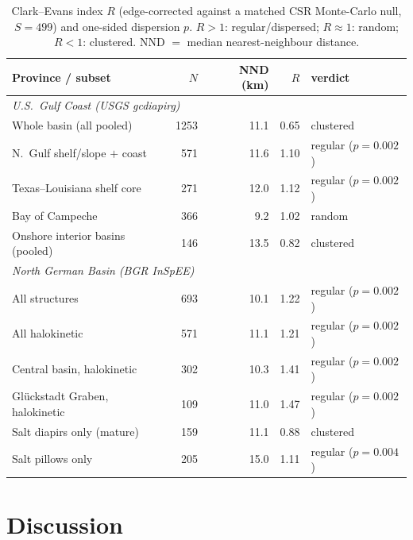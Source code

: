 \documentclass[11pt]{article}
\begin{document}
\begin{table}[t]
\centering
\caption{Clark--Evans index $R$ (edge-corrected against a matched CSR Monte-Carlo null, $S=499$) and
one-sided dispersion $p$. $R>1$: regular/dispersed; $R\approx1$: random; $R<1$: clustered. NND $=$ median
nearest-neighbour distance.}
\label{tab:R}
\small
\begin{tabular}{lrrrl}
\toprule
Province / subset & $N$ & NND (km) & $R$ & verdict \\
\midrule
\multicolumn{5}{l}{\emph{U.S.\ Gulf Coast (USGS gcdiapirg)}}\\
\quad Whole basin (all pooled)            & 1253 & 11.1 & 0.65 & clustered \\
\quad N.\ Gulf shelf/slope $+$ coast      & 571  & 11.6 & 1.10 & regular ($p=0.002$) \\
\quad Texas--Louisiana shelf core         & 271  & 12.0 & 1.12 & regular ($p=0.002$) \\
\quad Bay of Campeche                     & 366  & 9.2  & 1.02 & random \\
\quad Onshore interior basins (pooled)    & 146  & 13.5 & 0.82 & clustered \\
\midrule
\multicolumn{5}{l}{\emph{North German Basin (BGR InSpEE)}}\\
\quad All structures                      & 693  & 10.1 & 1.22 & regular ($p=0.002$) \\
\quad All halokinetic                     & 571  & 11.1 & 1.21 & regular ($p=0.002$) \\
\quad Central basin, halokinetic          & 302  & 10.3 & 1.41 & regular ($p=0.002$) \\
\quad Gl\"uckstadt Graben, halokinetic    & 109  & 11.0 & 1.47 & regular ($p=0.002$) \\
\quad Salt diapirs only (mature)          & 159  & 11.1 & 0.88 & clustered \\
\quad Salt pillows only                   & 205  & 15.0 & 1.11 & regular ($p=0.004$) \\
\bottomrule
\end{tabular}
\end{table}

\section{Discussion}
\end{document}
